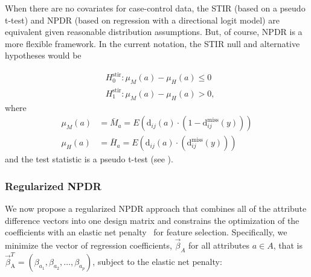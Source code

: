 \documentclass[10pt]{article}
\begin{document}
When there are no covariates for case-control data, the STIR (based on a pseudo t-test) and NPDR (based on regression with a directional logit model) are equivalent given reasonable distribution assumptions. But, of course, NPDR is a more flexible framework. In the current notation, the STIR null and alternative hypotheses would be


\begin{equation}
\begin{aligned}
    & H^{\text{stir}}_0: \mu_M(a) - \mu_H(a) \le 0 \\
    & H^{\text{stir}}_1: \mu_M(a) - \mu_H(a) > 0,
\end{aligned}
\end{equation}  
where
\begin{equation}
\begin{aligned}
    \mu_M(a) & = \bar{M}_a = E \left( \text{d}_{ij}(a) \cdot \left( 1-\text{d}^{\text{miss}}_{ij}(y) \right) \right) \\
    \mu_H(a) & = \bar{H}_a = E \left( \text{d}_{ij}(a) \cdot \left( \text{d}^{\text{miss}}_{ij}(y) \right) \right)
\end{aligned}
\end{equation}  
and the test statistic is a pseudo t-test (see \cite{stir}).

\subsubsection{Regularized NPDR}

We now propose a regularized NPDR approach that combines all of the attribute difference vectors into one design matrix and constrains the optimization of the coefficients with an elastic net penalty~\cite{glmnet05} for feature selection. Specifically, we minimize the vector of regression coefficients, $ \vec{\beta}_A$ for all attributes $a \in A$, that is $\vec{\beta}^{T}_{\text{A}} = (\beta_{a_1}, \beta_{a_2}, \ldots, \beta_{a_p})$, subject to the elastic net penalty: 
\end{document}
